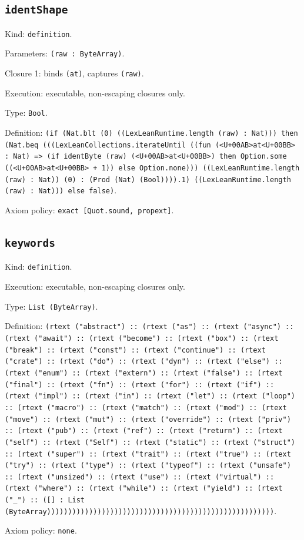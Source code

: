 \documentclass[11pt]{article}
\begin{document}
\subsection*{\texttt{identShape}}
\noindent Kind: \texttt{definition}.\par
\noindent Parameters: \texttt{(raw : ByteArray)}.\par
\noindent Closure 1: binds \texttt{(at)}, captures \texttt{(raw)}.\par
\noindent Execution: executable, non-escaping closures only.\par
\noindent Type: \texttt{Bool}.\par
\noindent Definition: \texttt{(if (Nat.blt (0) ((LexLeanRuntime.length (raw) : Nat))) then (Nat.beq (((LexLeanCollections.iterateUntil ((fun (<U+00AB>at<U+00BB> : Nat) => (if identByte (raw) (<U+00AB>at<U+00BB>) then Option.some ((<U+00AB>at<U+00BB> + 1)) else Option.none))) ((LexLeanRuntime.length (raw) : Nat)) (0) : (Prod (Nat) (Bool)))).1) ((LexLeanRuntime.length (raw) : Nat))) else false)}.\par
\noindent Axiom policy: \texttt{exact [Quot.sound, propext]}.\par
\subsection*{\texttt{keywords}}
\noindent Kind: \texttt{definition}.\par
\noindent Execution: executable, non-escaping closures only.\par
\noindent Type: \texttt{List (ByteArray)}.\par
\noindent Definition: \texttt{(rtext ("abstract") :: (rtext ("as") :: (rtext ("async") :: (rtext ("await") :: (rtext ("become") :: (rtext ("box") :: (rtext ("break") :: (rtext ("const") :: (rtext ("continue") :: (rtext ("crate") :: (rtext ("do") :: (rtext ("dyn") :: (rtext ("else") :: (rtext ("enum") :: (rtext ("extern") :: (rtext ("false") :: (rtext ("final") :: (rtext ("fn") :: (rtext ("for") :: (rtext ("if") :: (rtext ("impl") :: (rtext ("in") :: (rtext ("let") :: (rtext ("loop") :: (rtext ("macro") :: (rtext ("match") :: (rtext ("mod") :: (rtext ("move") :: (rtext ("mut") :: (rtext ("override") :: (rtext ("priv") :: (rtext ("pub") :: (rtext ("ref") :: (rtext ("return") :: (rtext ("self") :: (rtext ("Self") :: (rtext ("static") :: (rtext ("struct") :: (rtext ("super") :: (rtext ("trait") :: (rtext ("true") :: (rtext ("try") :: (rtext ("type") :: (rtext ("typeof") :: (rtext ("unsafe") :: (rtext ("unsized") :: (rtext ("use") :: (rtext ("virtual") :: (rtext ("where") :: (rtext ("while") :: (rtext ("yield") :: (rtext ("\_") :: ([] : List (ByteArray))))))))))))))))))))))))))))))))))))))))))))))))))))))}.\par
\noindent Axiom policy: \texttt{none}.\par
\end{document}
